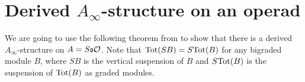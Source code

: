 \documentclass[join.tex]{subfiles}
\begin{document}
%
%
%
%
%
%



\section{Derived $A_\infty$-structure on an operad}\label{derivedstructure}


We are going to use the following theorem from \cite{whitehouse} to show that there is a derived $A_\infty$-structure on $A=S\mathfrak{s}{\mathcal O}$. Note that $\mathrm{Tot}(SB)=S\mathrm{Tot}(B)$ for any bigraded module $B$, where $SB$ is the vertical suspension of $B$ and $S\mathrm{Tot}(B)$ is the suspension of $\mathrm{Tot}(B)$ as graded modules.
\end{document}
